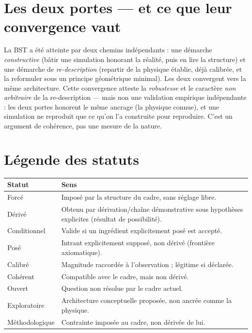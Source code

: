 \documentclass[11pt]{book}
\begin{document}
\section{Les deux portes --- et ce que leur convergence vaut}
La BST a été atteinte par deux chemins indépendants : une démarche \emph{constructive} (bâtir une simulation honorant la réalité, puis en lire la structure) et une démarche de \emph{re-description} (repartir de la physique établie, déjà calibrée, et la reformuler sous un principe géométrique minimal). Les deux convergent vers la même architecture. Cette convergence atteste la \emph{robustesse} et le caractère \emph{non arbitraire} de la re-description --- mais non une validation empirique indépendante : les deux portes honorent le même ancrage (la physique connue), et une simulation ne reproduit que ce qu'on l'a construite pour reproduire. C'est un argument de cohérence, pas une mesure de la nature.

\section{Légende des statuts}
\begin{center}
\begin{tabular}{ll}
\hline
Statut & Sens \\
\hline
Forcé & Imposé par la structure du cadre, sans réglage libre. \\
Dérivé & Obtenu par dérivation/chaîne démonstrative sous hypothèses explicites (résultat de possibilité). \\
Conditionnel & Valide si un ingrédient explicitement posé est accepté. \\
Posé & Intrant explicitement supposé, non dérivé (frontière axiomatique). \\
Calibré & Magnitude raccordée à l'observation ; légitime si déclarée. \\
Cohérent & Compatible avec le cadre, mais non dérivé. \\
Ouvert & Question non résolue par le cadre actuel. \\
Exploratoire & Architecture conceptuelle proposée, non ancrée comme la physique. \\
Méthodologique & Contrainte imposée au cadre, non dérivée de lui. \\
\hline
\end{tabular}
\end{center}
\end{document}
